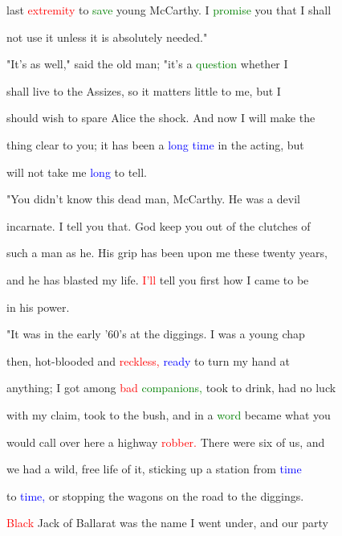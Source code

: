  last \textcolor{red}{extremity} to \textcolor{green}{save} \textcolor{BurntOrange}{young} McCarthy. I \textcolor{green}{promise} you that I shall

 not use it unless it is absolutely needed."



 "It's as well," said the old man; "it's a \textcolor{green}{question} whether I

 shall live to the Assizes, so it matters little to me, but I

 should wish to spare Alice the \textcolor{BurntOrange}{shock.} And now I will make the

 thing clear to you; it has been a \textcolor{blue}{long} \textcolor{blue}{time} in the acting, but

 will not take me \textcolor{blue}{long} to tell.



 "You didn't know this dead man, McCarthy. He was a \textcolor{BurntOrange}{devil}

 incarnate. I tell you that. \textcolor{BurntOrange}{God} keep you out of the clutches of

 such a man as he. His grip has been upon me these twenty years,

 and he has \textcolor{BurntOrange}{blasted} my life. \textcolor{red}{I'll} tell you first how I came to be

 in his power.



 "It was in the early '60's at the diggings. I was a \textcolor{BurntOrange}{young} chap

 then, hot-blooded and \textcolor{red}{reckless,} \textcolor{blue}{ready} to turn my hand at

 anything; I got among \textcolor{red}{bad} \textcolor{green}{companions,} took to drink, had no \textcolor{BurntOrange}{luck}

 with my claim, took to the bush, and in a \textcolor{green}{word} became what you

 would call over here a highway \textcolor{red}{robber.} There were six of us, and

 we had a \textcolor{BurntOrange}{wild,} free life of it, sticking up a station from \textcolor{blue}{time}

 to \textcolor{blue}{time,} or stopping the wagons on the road to the diggings.

 \textcolor{red}{Black} Jack of Ballarat was the name I went under, and our party

